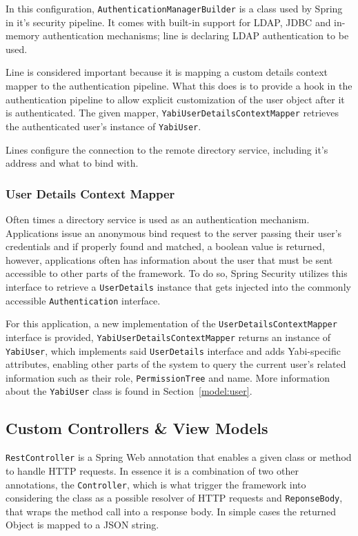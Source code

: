

In this configuration, \texttt{AuthenticationManagerBuilder} is a class used by Spring in it's security pipeline. It comes with built-in support for \gls{LDAP}, \gls{JDBC} and in-memory authentication mechanisms; line  is declaring \gls{LDAP} authentication to be used.

Line  is considered important because it is mapping a custom details context mapper to the authentication pipeline. What this does is to provide a hook in the authentication pipeline to allow explicit customization of the user object after it is authenticated. The given mapper, \texttt{YabiUserDetailsContextMapper} retrieves the authenticated user's instance of \texttt{YabiUser}.

Lines  configure the connection to the remote directory service, including it's address and what to bind with.

\subsubsection{User Details Context Mapper}\label{impl:detailsmapper}
Often times a directory service is used as an authentication mechanism. Applications issue an anonymous bind request to the server passing their user's credentials and if properly found and matched, a boolean value is returned, however, applications often has information about the user that must be sent accessible to other parts of the framework. To do so, Spring Security utilizes this interface to retrieve a \texttt{UserDetails} instance that gets injected into the commonly accessible \texttt{Authentication} interface.

For this application, a new implementation of the \texttt{UserDetailsContextMapper} interface is provided, \texttt{YabiUserDetailsContextMapper} returns an instance of \texttt{YabiUser}, which implements said \texttt{UserDetails} interface and adds \gls{Yabi}-specific attributes, enabling other parts of the system to query the current user's related information such as their role, \texttt{PermissionTree} and name. More information about the \texttt{YabiUser} class is found in Section~\ref{model:user}.

\subsection{Custom Controllers \& View Models}
\texttt{RestController} is a Spring Web annotation that enables a given class or method to handle \gls{HTTP} requests. In essence it is a combination of two other annotations, the \texttt{Controller}, which is what trigger the framework into considering the class as a possible resolver of  \gls{HTTP} requests and \texttt{ReponseBody}, that wraps the method call into a response body. In simple cases the returned Object is mapped to a \gls{JSON} string.


